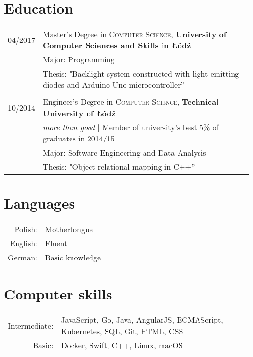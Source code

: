 \documentclass[a4paper,10pt]{article}
\begin{document}
\section{Education}

\begin{tabular}{rl}

04/2017 & Master's Degree in \textsc{Computer Science}, \textbf{University of Computer Sciences and Skills in Łódź} \\
& \small  Major: Programming\\
& \small Thesis: "Backlight system constructed with light-emitting diodes and Arduino Uno microcontroller'' \\&\\


10/2014 & Engineer's Degree in \textsc{Computer Science}, \textbf{Technical University of Łódź} \\
& \small\emph{more than good} | Member of university’s best 5\% of graduates in 2014/15\\
& \small  Major: Software Engineering and Data Analysis \\
& \small Thesis: "Object-relational mapping in C++'' \\

\end{tabular}

\section{Languages}

\begin{tabular}{rl}
	Polish: & Mothertongue\\
	English: & Fluent\\
	German: & Basic knowledge\\
\end{tabular}

\section{Computer skills}

\begin{tabular}{rl}
	Intermediate: & JavaScript, Go, Java, AngularJS, ECMAScript, Kubernetes, SQL, Git, HTML, CSS \\
	Basic: & Docker, Swift, C++, Linux, macOS \\
\end{tabular}
\end{document}
